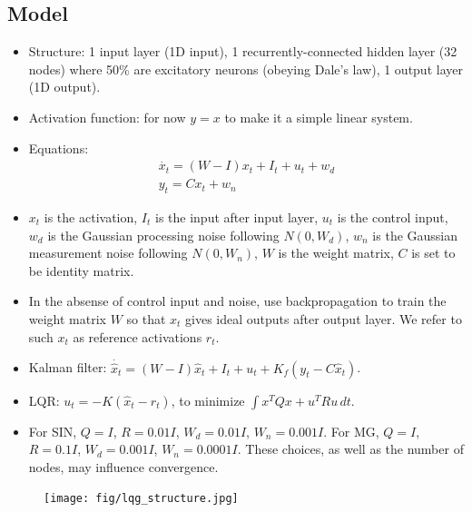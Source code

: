 \documentclass[12pt, a4paper]{article}
\begin{document}
\subsection*{Model}
\begin{itemize}
    \item Structure: 1 input layer (1D input), 1 recurrently-connected hidden layer (32 nodes) where 50\% are excitatory neurons (obeying Dale's law), 1 output layer (1D output). 

    \item Activation function: for now $y=x$ to make it a simple linear system.
    
    \item Equations: 
    \begin{eqnarray}
    \nonumber
    \dot{x_t} = (W-I)x_t + I_{t} + u_{t} + w_d \\
    \nonumber
    y_t = Cx_{t} + w_n
    \end{eqnarray}
    
    \item $x_t$ is the activation, $I_t$ is the input after input layer, $u_t$ is the control input, $w_d$ is the Gaussian processing noise following $N(0,W_d)$, $w_n$ is the Gaussian measurement noise following $N(0,W_n)$, $W$ is the weight matrix, $C$ is set to be identity matrix.

    \item In the absense of control input and noise, use backpropagation to train the weight matrix $W$ so that $x_t$ gives ideal outputs after output layer. We refer to such $x_t$ as reference activations $r_t$.

    \item Kalman filter: $\dot{\hat{x}_t} = (W-I)\hat{x}_t + I_{t} + u_{t} + K_f(y_t - C\hat{x}_t)$.
    
    \item LQR: $u_t = -K(\hat{x}_t - r_t)$, to minimize $\int x^TQx + u^TRu \,dt$.

    \item For SIN, $Q = I$, $R = 0.01I$, $W_d = 0.01I$, $W_n = 0.001I$. For MG, $Q = I$, $R = 0.1I$, $W_d = 0.001I$, $W_n = 0.0001I$. These choices, as well as the number of nodes, may influence convergence.

\end{itemize}

\begin{figure}[H]
    \centering
    \texttt{[image: fig/lqg\_structure.jpg]}
\end{figure}
\end{document}
